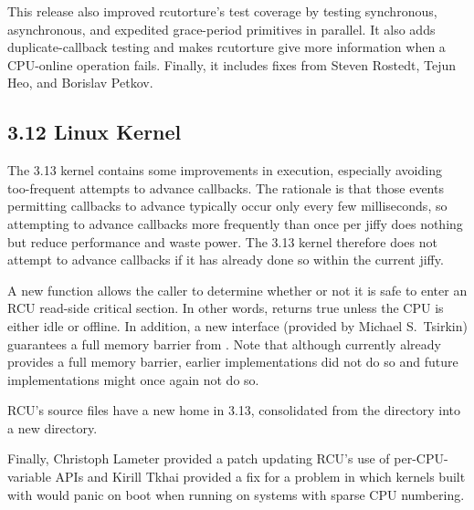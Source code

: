 This release also improved rcutorture's test coverage by testing
synchronous, asynchronous, and expedited grace-period primitives
in parallel.
It also adds duplicate-callback testing and makes rcutorture give
more information when a CPU-online operation fails.
Finally, it includes fixes from Steven Rostedt, Tejun Heo, and Borislav
Petkov.

\subsection{3.12 Linux Kernel}

The 3.13 kernel contains some improvements in 
execution, especially avoiding too-frequent attempts to advance callbacks.
The rationale is that those events permitting callbacks to advance
typically occur only every few milliseconds, so attempting to advance callbacks
more frequently than once per jiffy does nothing but reduce performance and
waste power.
The 3.13 kernel therefore does not attempt to advance callbacks if it
has already done so within the current jiffy.

A new  function allows the caller to determine
whether or not it is safe to enter an RCU read-side critical section.
In other words,  returns true unless the CPU is
either idle or offline.
In addition, a new 
interface (provided by Michael S.~Tsirkin)
guarantees a full memory barrier from .
Note that although  currently already provides
a full memory barrier, earlier implementations did not do so and
future implementations might once again not do so.

RCU's source files have a new home in 3.13, consolidated from the
 directory into a new  directory.

Finally, Christoph Lameter provided a patch updating RCU's use of
per-CPU-variable APIs and Kirill Tkhai provided a fix for a problem
in which kernels built with  would
panic on boot when running
on systems with sparse CPU numbering.
